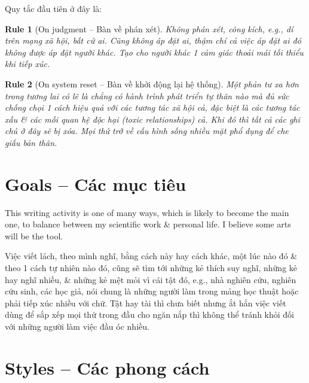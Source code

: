\documentclass[12pt,twoside]{book}
\newtheorem{Rule}{Rule}
\begin{document}
Quy tắc đầu tiên ở đây là:
\begin{Rule}[On judgment -- Bàn về phán xét]
	Không phán xét, công kích, e.g., dí trên mạng xã hội, bất cứ ai. Cũng không áp đặt ai, thậm chí cả việc áp đặt ai đó không được áp đặt người khác. Tạo cho người khác 1 cảm giác thoải mái tối thiểu khi tiếp xúc.
\end{Rule}

\begin{Rule}[On system reset -- Bàn về khởi động lại hệ thống]
	Một phản tư xa hơn trong tương lai có lẽ là chẳng có hành trình phát triển tự thân nào mà đủ sức chống chọi 1 cách hiệu quả với các tương tác xã hội cả, đặc biệt là các tương tác xấu \& các mối quan hệ độc hại (toxic relationships) cả. Khi đó thì tất cả các ghi chú ở đây sẽ bị xóa. Mọi thứ trở về cấu hình sống nhiều mặt phổ dụng để che giấu bản thân.
\end{Rule} 

\section{Goals -- Các mục tiêu}
This writing activity is one of many ways, which is likely to become the main one, to balance between my scientific work \& personal life. I believe some arts will be the tool.

Việc viết lách, theo mình nghĩ, bằng cách này hay cách khác, một lúc nào đó \& theo 1 cách tự nhiên nào đó, cũng sẽ tìm tới những kẻ thích suy nghĩ, những kẻ hay nghĩ nhiều, \& những kẻ mệt mỏi vì cái tật đó, e.g., nhà nghiên cứu, nghiên cứu sinh, các học giả, nói chung là những người làm trong mảng học thuật hoặc phải tiếp xúc nhiều với chữ. Tật hay tài thì chưa biết nhưng ắt hẳn việc viết dùng để sắp xếp mọi thứ trong đầu cho ngăn nắp thì không thể tránh khỏi đối với những người làm việc đầu óc nhiều.

\section{Styles -- Các phong cách}
\end{document}
